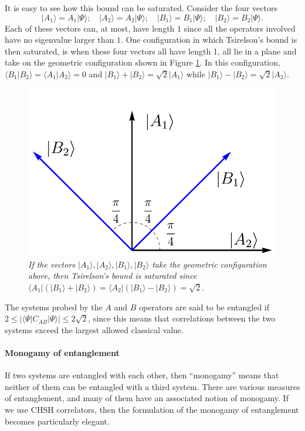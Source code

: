 \documentclass[12pt]{article}
\newcommand{\be}{\begin{equation}}
\newcommand{\ee}{\end{equation}}
\begin{document}
It is easy to see how this bound can be saturated. Consider the four vectors
\be
|A_1 \rangle = A_1 | \Psi \rangle; \quad  |A_2 \rangle = A_2 | \Psi \rangle; \quad  |B_1 \rangle = B_1 | \Psi \rangle; \quad  |B_2 \rangle = B_2 | \Psi \rangle.
\ee
Each of these vectors can, at most, have length $1$ since all the operators involved have no eigenvalue larger than $1$.   One configuration in which Tsirelson's bound is then saturated, is  when these four vectors all have length 1, all lie in a plane and take on the geometric configuration shown in Figure \ref{figcirelson}. In this configuration, $\langle B_1 | B_2 \rangle = \langle A_1 | A_2 \rangle = 0$ and  $|B_1 \rangle + |B_2 \rangle = \sqrt{2} |A_1 \rangle$ while $|B_1 \rangle - |B_2 \rangle = \sqrt{2} |A_2 \rangle$.
\begin{figure}[!ht]
\begin{center}
\includegraphics[height=0.3\textheight]{cirelsonplot.pdf}
\caption{\em If the vectors $|A_1 \rangle, |A_2 \rangle, |B_1 \rangle, |B_2 \rangle$ take the geometric configuration above, then Tsirelson's bound is saturated since $\langle A_1 | (|B_1 \rangle + |B_2 \rangle)  = \langle A_2| (|B_1 \rangle - |B_2 \rangle ) = \sqrt{2}$. \label{figcirelson}}
\end{center}
\end{figure}

The systems probed by the $A$ and $B$ operators are said to be entangled if $2 \leq |\langle \Psi | C_{AB} |\Psi  \rangle| \leq 2 \sqrt{2}$, since this means that correlations between the two systems exceed the largest allowed classical value.



\paragraph{\bf Monogamy of entanglement \\}
If  two systems are entangled with each other, then ``monogamy'' means that neither of them can be entangled with a third system. There are various measures of entanglement, and many of them have an associated notion of monogamy. If we use CHSH
correlators, then the formulation of the monogamy of entanglement becomes particularly elegant.
\end{document}

